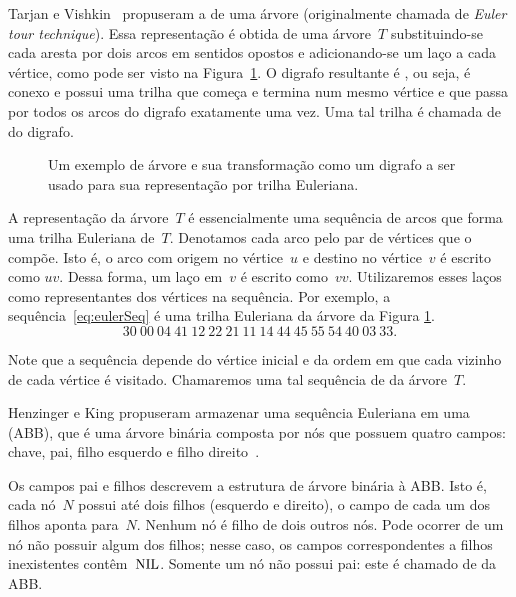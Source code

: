 Tarjan e Vishkin~\cite{tarjan1985} propuseram a  de uma árvore (originalmente chamada de \textit{Euler tour technique}).
Essa representação é obtida de uma árvore~$T$ substituindo-se cada aresta por dois arcos em sentidos opostos e adicionando-se um laço a cada vértice, como pode ser visto na Figura~\ref{fig:exemploSeqEuler}. O digrafo resultante é , ou seja, é conexo e possui uma trilha que começa e termina num mesmo vértice e que passa por todos os arcos do digrafo exatamente uma vez. Uma tal trilha é chamada de  do digrafo.


\begin{figure}[htb]
\centering


\caption{Um exemplo de árvore e sua transformação como um digrafo a ser usado para sua representação por trilha Euleriana.}
\label{fig:exemploSeqEuler}
\end{figure}

A representação da árvore~$T$ é essencialmente uma sequência de arcos que forma uma trilha Euleriana de~$T$.
Denotamos cada arco pelo par de vértices que o compõe.
Isto é, o arco com origem no vértice~$u$ e destino no vértice~$v$ é escrito como $uv$.
Dessa forma, um laço em~$v$ é escrito como~$vv$.
Utilizaremos esses laços como representantes dos vértices na sequência. 
Por exemplo, a sequência~\eqref{eq:eulerSeq} é uma trilha Euleriana da árvore da Figura \ref{fig:exemploSeqEuler}.
\begin{equation}
30~00~04~41~12~22~21~11~14~44~45~55~54~40~03~33.\label{eq:eulerSeq}  
\end{equation}

Note que a sequência depende do vértice inicial e da ordem em que cada vizinho de cada vértice é visitado. Chamaremos uma tal sequência de  da árvore~$T$.

Henzinger e King \cite{HenzingerKing} propuseram armazenar uma sequência Euleriana em uma  (ABB), que é uma árvore binária composta por nós que possuem  quatro campos: chave, pai, filho esquerdo e filho direito~\cite{CLRS}.

Os campos pai e filhos descrevem a estrutura de árvore binária à ABB. Isto é, cada nó~$N$ possui até dois filhos (esquerdo e direito), o campo  de cada um dos filhos aponta para~$N$. Nenhum nó é filho de dois outros nós. Pode ocorrer de um nó não possuir algum dos filhos; nesse caso, os campos correspondentes a filhos inexistentes contêm~$\text{NIL}$. Somente um nó não possui pai: este é chamado de  da ABB.

